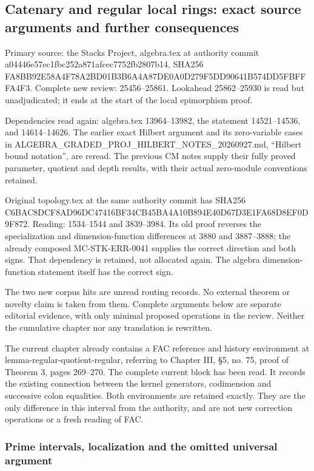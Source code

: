 \subsection{Catenary and regular local rings: exact source arguments and further consequences}\label{algebra-proof-020-catenary-and-regular-local-rings-exact-source-arguments-and-further-consequences}

Primary source: the Stacks Project, algebra.tex at authority commit a04446e57ec1fbc252a871afcec7752fb2807b14, SHA256 FA8BB92E58A4F78A2BD01B3B6A4A87DE0A0D279F5DD90641B574DD5FBFFFA4F3. Complete new review: 25456--25861. Lookahead 25862--25930 is read but unadjudicated; it ends at the start of the local epimorphism proof.

Dependencies read again: algebra.tex 13964--13982, the statement 14521--14536, and 14614--14626. The earlier exact Hilbert argument and its zero-variable cases in ALGEBRA\_GRADED\_PROJ\_HILBERT\_NOTES\_20260927.md, ``Hilbert bound notation'', are reread. The previous CM notes supply their fully proved parameter, quotient and depth results, with their actual zero-module conventions retained.

Original topology.tex at the same authority commit has SHA256 C6BAC8DCF8AD96DC47416BF34CB45BA4A10B894E40D67D3E1FA68D8EF0D9F872. Reading: 1534--1544 and 3839--3984. Its old proof reverses the specialization and dimension-function differences at 3880 and 3887--3888; the already composed MC-STK-ERR-0041 supplies the correct direction and both signs. That dependency is retained, not allocated again. The algebra dimension-function statement itself has the correct sign.

The two new corpus hits are unread routing records. No external theorem or novelty claim is taken from them. Complete arguments below are separate editorial evidence, with only minimal proposed operations in the review. Neither the cumulative chapter nor any translation is rewritten.

The current chapter already contains a FAC reference and history environment at lemma-regular-quotient-regular, referring to Chapter III, §5, no. 75, proof of Theorem 3, pages 269--270. The complete current block has been read. It records the existing connection between the kernel generators, codimension and successive colon equalities. Both environments are retained exactly. They are the only difference in this interval from the authority, and are not new correction operations or a fresh reading of FAC.

\subsubsection{Prime intervals, localization and the omitted universal argument}\label{algebra-proof-020-prime-intervals-localization-and-the-omitted-universal-argument}

